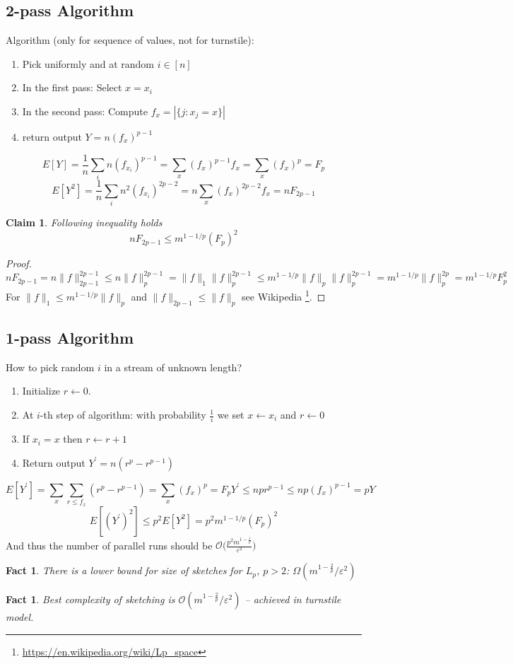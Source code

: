 \documentclass[11pt]{article}
\newtheorem{claim}[theorem]{Claim}
\newtheorem{fact}[theorem]{Fact}
\begin{document}
\subsection{2-pass Algorithm}
Algorithm (only for sequence of values, not for turnstile):
  \begin{enumerate}
    \item Pick uniformly and at random $i \in [n]$
    \item In the first pass: Select $x = x_i$
    \item In the second pass: Compute $f_{x} = |\{ j : x_j = x \}|$
    \item return output $Y = n (f_x)^{p-1}$
  \end{enumerate}
$$E[Y] = \frac{1}{n}\sum_{i} n(f_{x_i})^{p-1} = \sum_{x} (f_x)^{p-1} f_x = \sum_{x} (f_x)^p = F_p$$
$$E[Y^2] = \frac{1}{n}\sum_{i}n^2 (f_{x_i})^{2p-2} = n \sum_{x} (f_x)^{2p-2} f_x = n F_{2p-1}$$

\begin{claim}
  Following inequality holds $$n F_{2p-1} \leq m^{1-1/p} (F_p)^2$$
\end{claim}
\begin{proof}
$$nF_{2p-1} = n \|f\|_{2p-1}^{2p-1} \leq n \|f\|_{p}^{2p-1} = \|f\|_1 \|f\|_p^{2p-1} \leq m^{1 - 1/p} \|f\|_p \|f\|_p^{2p-1} = m^{1 - 1/p} \|f\|_p^{2p} = m^{1 - 1/p} F_p^2$$
For $\|f\|_1 \leq m^{1 - 1/p} \|f\|_p$ and $\|f\|_{2p-1} \le \|f\|_p$ see Wikipedia \footnote{\url{https://en.wikipedia.org/wiki/Lp_space}}.
\end{proof}
\subsection{1-pass Algorithm}
How to pick random $i$ in a stream of unknown length?
\begin{enumerate}
  \item Initialize $r \gets 0$.
  \item At $i$-th step of algorithm: with probability $\frac{1}{i}$ we set $x \gets x_i$ and $r \gets 0$
  \item If $x_{i} = x$ then $r \gets r + 1$
  \item Return output $Y^\prime = n(r^p - r^{p-1})$
\end{enumerate}
$$E[Y^\prime] = \sum_x \sum_{r \leq f_x} (r^p-r^{p-1}) = \sum_x (f_x)^p = F_p
Y^\prime \leq n p r^{p-1} \leq n p (f_x)^{p-1} = p Y$$
$$E[(Y^\prime)^2] \leq p^2 E[Y^2] = p^2 m^{1-1/p} (F_p)^2$$
And thus the number of parallel runs should be $\mathcal{O}\Big(\frac{p^2 m^{1 - \frac{1}{p}}}{\varepsilon^2}\Big)$

\begin{fact}
  There is a lower bound for size of sketches for $L_p$, $p > 2$: $\Omega(m^{1-\frac{2}{p}}/\varepsilon^2)$ \cite{DBLP:journals/jcss/Bar-YossefJKS04}
\end{fact}
\begin{fact}
  Best complexity of sketching is $\mathcal{O}(m^{1-\frac{2}{p}}/\varepsilon^2)$ -- achieved in turnstile model. \cite{DBLP:conf/stoc/IndykW05}
\end{fact}



\end{document}
